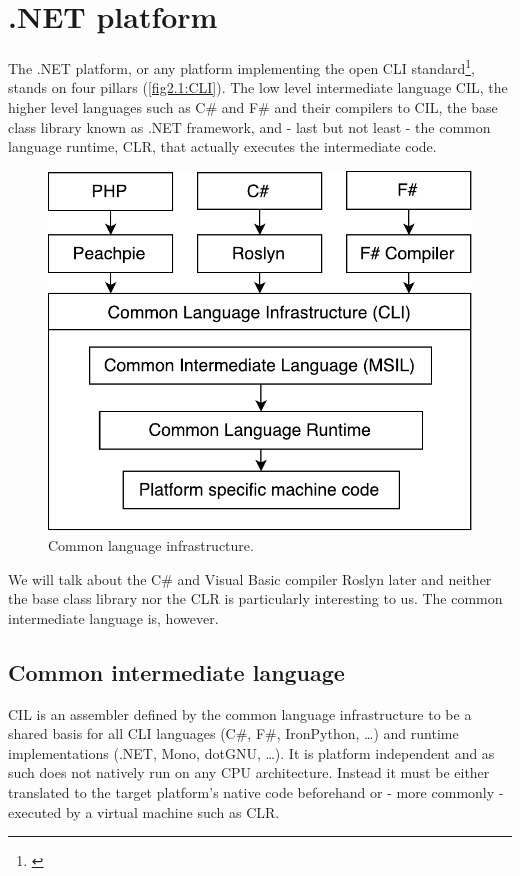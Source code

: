 \chapter{.NET platform}

The .NET platform, or any platform implementing the open CLI standard\footnote{\citep{CLIEcma}}, stands on four pillars (\autoref{fig2.1:CLI}). The low level intermediate language CIL, the higher level languages such as C\# and F\# and their compilers to CIL, the base class library known as .NET framework, and - last but not least - the common language runtime, CLR, that actually executes the intermediate code.

\begin{figure}[h]
	\centering	
	\includegraphics[scale=0.75]{../img/2_1_CLI}	
	\caption{Common language infrastructure.}
	\label{fig2.1:CLI}
\end{figure}

We will talk about the C\# and Visual Basic compiler Roslyn later and neither the base class library nor the CLR is particularly interesting to us. The common intermediate language is, however. 

\section{Common intermediate language}\label{CIL}

CIL is an assembler defined by the common language infrastructure \citep{CLIEcma} to be a shared basis for all CLI languages (C\#, F\#, IronPython, …) and runtime implementations (.NET, Mono, dotGNU, …). It is platform independent and as such does not natively run on any CPU architecture. Instead it must be either translated to the target platform’s native code beforehand or - more commonly - executed by a virtual machine such as CLR.

